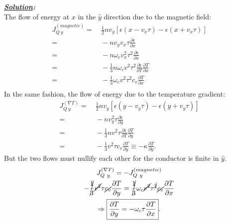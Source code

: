 \documentclass[notitlepage]{report}
\begin{document}
\begin{question}[title = Question 4.2 + 4.3]{}{}
\textbf{\emph{\underline{Solution}:}}\\
The flow of energy at $x$ in the $\hat{y}$ direction due to the magnetic field:\\
\begin{align*}
	J_{Q\ y}^{\left(magnetic\right) } =&\ \frac{1}{2}nv_y\left[\epsilon\left(x-v_x\tau\right)-\epsilon\left(x+v_x\tau\right)  \right]\\
	=&\ -nv_yv_x\tau\frac{\partial\epsilon}{\partial x}\\
	=&\ -n\omega_cv_x^2\tau^2\frac{\partial\epsilon}{\partial x}\\
	=&\ -\frac{1}{3}n\omega_cv^2\tau^2\frac{\partial\epsilon}{\partial T}\frac{\partial T}{\partial x} \\
	=&\ -\frac{1}{3}\omega_cv^2\tau^2c_v\frac{\partial T}{\partial x} \\
\end{align*}
In the same fashion, the flow of energy due to the temperature gradient:\\
\begin{align*}
	J_{Q\ y}^{\left(\nabla T\right) } =&\ \frac{1}{2}nv_y\left[\epsilon\left(y-v_y\tau\right)-\epsilon\left(y+v_y\tau\right)  \right]\\
	=&\ -nv_y^2\tau\frac{\partial\epsilon}{\partial y}\\
	=&\ -\frac{1}{3}nv^2\tau\frac{\partial\epsilon}{\partial T}\frac{\partial T}{\partial y} \\
	=&\ -\frac{1}{3}v^2\tau c_v\frac{\partial T}{\partial y}\equiv-\kappa\frac{\partial T}{\partial y}
.\end{align*}
But the two flows must nullify each other for the conductor is finite in $\hat{y}$.\\
\begin{gather*}
	J_{Q\ y}^{\left(\nabla T\right) } = -J_{Q\ y}^{\left(magnetic\right) }\\
-\cancel{\frac{1}{3}}\cancel{v^2}\tau \cancel{c_v}\frac{\partial T}{\partial y} = \cancel{\frac{1}{3}}\omega_c\cancel{v^2}\tau^{\cancel{2}} \cancel{c_v}\frac{\partial T}{\partial x} \\
\Rightarrow \boxed{\frac{\partial T}{\partial y} = -\omega_c\tau\frac{\partial T}{\partial x}
}.\end{gather*}
\end{question}
\end{document}
